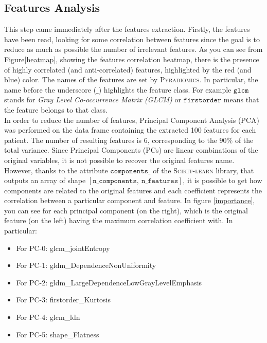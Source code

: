 \documentclass{standalone}
\begin{document}
\subsection{Features Analysis}

This step came immediately after the features extraction.
Firstly, the features have been read, looking for some correlation between features since the goal is to reduce as much as possible the number of irrelevant features.
As you can see from Figure\ref{heatmap}, showing the features correlation heatmap, there is the presence of highly correlated (and anti-correlated) features, highlighted by the red (and blue) color.
The names of the features are set by \textsc{Pyradiomics}. In particular, the name before the underscore ($\_$) highlights the feature class. For example $\mathtt{glcm}$ stands for \textit{Gray Level Co-occurrence Matrix (GLCM)} or $\mathtt{firstorder}$ means that the feature belongs to that class.
\\
In order to reduce the number of features, Principal Component Analysis (PCA) was performed on the data frame containing the extracted 100 features for each patient.
The number of resulting features is 6, corresponding to the $90 \% $ of the total variance.
Since Principal Components (PCs) are linear combinations of the original variables, it is not possible to recover the original features name. 
However, thanks to the attribute $\mathtt{components\_}$ of the \textsc{Scikit-learn} library\cite{scikit}, that outputs an array of shape $[ \mathtt{n \_ components} , \:  \mathtt{n \_ features} ]$, it is possible to get how components are related to the original features and each coefficient represents the correlation between a particular component and feature.
In figure \ref{importance}, you can see for each principal component (on the right), which is the original feature (on the left)  having the maximum correlation coefficient with. 
In particular: 
\begin{itemize}
    \item For PC-0: glcm\_jointEntropy
    \item For PC-1: gldm\_DependenceNonUniformity
    \item For PC-2: gldm\_LargeDependenceLowGrayLevelEmphasis
    \item For PC-3: firstorder\_Kurtosis
    \item For PC-4: glcm\_ldn
    \item For PC-5: shape\_Flatness
\end{itemize}
\end{document}
